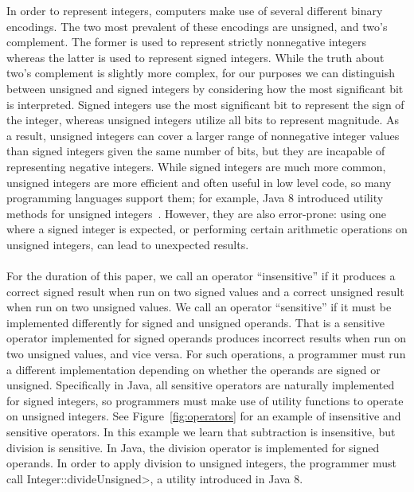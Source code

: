 In order to represent integers, computers make use of several different binary
encodings. The two most prevalent of these encodings are unsigned, and two's
complement. The former is used to represent strictly nonnegative integers
whereas the latter is used to represent signed integers.
While the truth about two's complement is slightly more complex, for our
purposes we can distinguish between unsigned and signed integers by considering
how the most significant bit is interpreted. Signed integers use the most
significant bit to represent the sign of the integer, whereas unsigned integers
utilize all bits to represent magnitude.
As a result, unsigned integers can cover a larger range of nonnegative integer
values than signed integers given the same number of bits, but they are
incapable of representing negative integers. While signed integers are much
more common,
unsigned integers are more efficient and often useful in low level code,
so many programming languages support them;
for example, Java 8 introduced utility methods for unsigned
integers~\cite{JDK8UnsignedIntegerArithmetic2012}.  However, they are also
error-prone:  using one where a signed
integer is expected, or performing certain arithmetic operations on unsigned
integers, can lead to unexpected results.\\
\\
For the duration of this paper,
we call an operator ``insensitive'' if it produces a correct signed result
when run on two signed values and a correct unsigned result
when run on two unsigned values.  We call an operator ``sensitive'' if it must
be implemented differently for signed and unsigned operands. That is a sensitive
operator implemented for signed operands
produces incorrect results when run on two unsigned values, and vice versa.
For such
operations, a programmer must run a different implementation depending on
whether
the operands are signed or unsigned. Specifically in Java, all sensitive
operators are naturally implemented for signed integers, so programmers must
make use of utility functions to operate on unsigned integers.
See Figure~\ref{fig:operators} for
an example of insensitive and sensitive operators. In this example we learn
that subtraction is insensitive, but division is sensitive. In Java,
the division operator is implemented for signed operands. In order to apply
division to unsigned integers, the programmer must call
\<Integer::divideUnsigned>, a utility introduced in Java 8.

